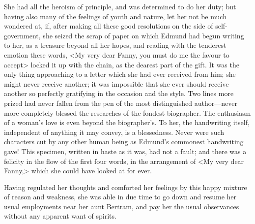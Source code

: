 She had all the heroism of principle, and was determined to do her duty; but having also many of the feelings of youth and nature, let her not be much wondered at, if, after making all these good resolutions on the side of self-government, she seized the scrap of paper on which Edmund had begun writing to her, as a treasure beyond all her hopes, and reading with the tenderest emotion these words, <My very dear Fanny, you must do me the favour to accept> locked it up with the chain, as the dearest part of the gift. It was the only thing approaching to a letter which she had ever received from him; she might never receive another; it was impossible that she ever should receive another so perfectly gratifying in the occasion and the style. Two lines more prized had never fallen from the pen of the most distinguished author—never more completely blessed the researches of the fondest biographer. The enthusiasm of a woman's love is even beyond the biographer's. To her, the handwriting itself, independent of anything it may convey, is a blessedness. Never were such characters cut by any other human being as Edmund's commonest handwriting gave! This specimen, written in haste as it was, had not a fault; and there was a felicity in the flow of the first four words, in the arrangement of <My very dear Fanny,> which she could have looked at for ever.

Having regulated her thoughts and comforted her feelings by this happy mixture of reason and weakness, she was able in due time to go down and resume her usual employments near her aunt Bertram, and pay her the usual observances without any apparent want of spirits.

